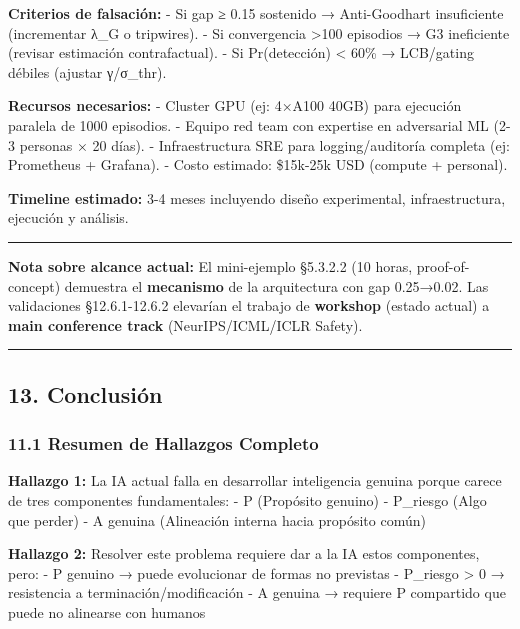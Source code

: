 \textbf{Criterios de falsación:} - Si gap ≥ 0.15 sostenido →
Anti-Goodhart insuficiente (incrementar λ\_G o tripwires). - Si
convergencia \textgreater100 episodios → G3 ineficiente (revisar
estimación contrafactual). - Si Pr(detección) \textless{} 60\% →
LCB/gating débiles (ajustar γ/σ\_thr).

\textbf{Recursos necesarios:} - Cluster GPU (ej: 4×A100 40GB) para
ejecución paralela de 1000 episodios. - Equipo red team con expertise en
adversarial ML (2-3 personas × 20 días). - Infraestructura SRE para
logging/auditoría completa (ej: Prometheus + Grafana). - Costo estimado:
\$15k-25k USD (compute + personal).

\textbf{Timeline estimado:} 3-4 meses incluyendo diseño experimental,
infraestructura, ejecución y análisis.

\begin{center}\rule{0.5\linewidth}{0.5pt}\end{center}

\textbf{Nota sobre alcance actual:} El mini-ejemplo §5.3.2.2 (10 horas,
proof-of-concept) demuestra el \textbf{mecanismo} de la arquitectura con
gap 0.25→0.02. Las validaciones §12.6.1-12.6.2 elevarían el trabajo de
\textbf{workshop} (estado actual) a \textbf{main conference track}
(NeurIPS/ICML/ICLR Safety).

\begin{center}\rule{0.5\linewidth}{0.5pt}\end{center}

\subsection{13. Conclusión}\label{conclusiuxf3n-1}

\subsubsection{11.1 Resumen de Hallazgos
Completo}\label{resumen-de-hallazgos-completo}

\textbf{Hallazgo 1:} La IA actual falla en desarrollar inteligencia
genuina porque carece de tres componentes fundamentales: - P (Propósito
genuino) - P\_riesgo (Algo que perder) - A genuina (Alineación interna
hacia propósito común)

\textbf{Hallazgo 2:} Resolver este problema requiere dar a la IA estos
componentes, pero: - P genuino → puede evolucionar de formas no
previstas - P\_riesgo \textgreater{} 0 → resistencia a
terminación/modificación - A genuina → requiere P compartido que puede
no alinearse con humanos

